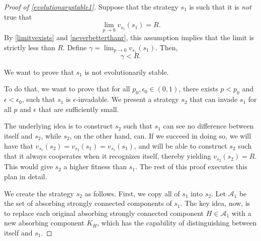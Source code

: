 \documentclass[12pt]{article}
\theoremstyle{definition}
\theoremstyle{remark}
\begin{document}
    \begin{proof}[Proof of \cref{evolutionarystable1}]
      Suppose that the strategy $s_1$ is such that it is \textit{not} true that \begin{equation*}
        \lim_{p \to 0 } v_{s_1}(s_1) = R.
      \end{equation*}
      By \cref{limitvexists} and \cref{neverbetterthanr}, this assumption implies that the limit is strictly less than $R$. Define $\gamma = \lim_{p \to 0} v_{s_1}(s_1)$. Then,
      \begin{equation*}
        \gamma < R.
      \end{equation*}
      
      We want to prove that $s_1$ is not evolutionarily stable. 
      
      To do that, we want to prove that for all $p_0, \epsilon_0 \in (0,1)$, there exists $p < p_0$ and $\epsilon < \epsilon_0$, such that $s_1$ is $\epsilon$-invadable. We present a strategy $s_2$ that can invade $s_1$ for all $p$ and $\epsilon$ that are sufficiently small.


      The underlying idea is to construct $s_2$ such that $s_1$ can see no difference between itself and $s_2$, while $s_2$, on the other hand, can. If we succeed in doing so, we will have that $v_{s_1}(s_2) = v_{s_2}(s_1) = v_{s_1}(s_1)$, and will be able to construct $s_2$ such that it always cooperates when it recognizes itself, thereby yielding $v_{s_2}(s_2) = R$. This would give $s_2$ a higher fitness than $s_1$. The rest of this proof executes this plan in detail.

      We create the strategy $s_2$ as follows. First, we copy all of $s_1$ into $s_2$. Let $\mathcal{A}_1$ be the set of
       absorbing strongly connected components of $s_1$. The key idea, now, is to replace each original absorbing strongly connected component $H \in \mathcal{A}_1$ with a new absorbing component $K_H$, which has the capability of distinguishing between itself and $s_1$.


\end{proof}
\end{document}

